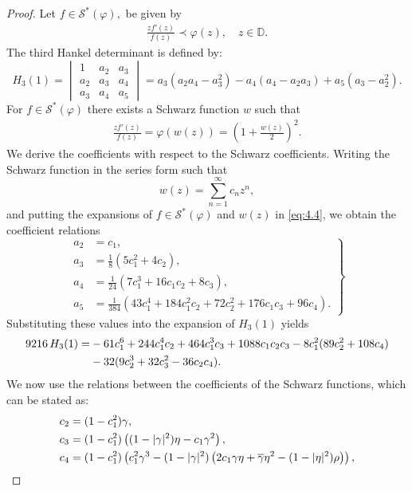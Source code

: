 \documentclass[10pt,a4paper]{amsart}
\begin{document}
\begin{proof}
Let $f\in \mathcal{S}^*(\varphi),$ be given by 
\begin{align*}
	\frac{z f'(z)}{f(z)}\prec \varphi(z), \quad z\in \mathbb{D}.
\end{align*}
 The third Hankel determinant is defined by:
\[
H_3(1)=
\begin{vmatrix}
	1 & a_2 & a_3 \\
	a_2 & a_3 & a_4 \\
	a_3 & a_4 & a_5
\end{vmatrix}
= a_3(a_2 a_4 - a_3^2)-a_4(a_4-a_2a_3)+a_5(a_3-a_2^2).
\]
For $f\in\mathcal{S}^*(\varphi)$ there exists a Schwarz function $w$ such that
\begin{align}\label{eq:4.4}
	\frac{z f'(z)}{f(z)}=\varphi(w(z))=\left(1+\frac{w(z)}{2}\right)^2.
\end{align}
We derive the coefficients with respect to the Schwarz coefficients.
Writing the Schwarz function in the series form such that
\[
w(z)=\sum_{n=1}^{\infty} c_n z^n,
\]
and putting the expansions of $f\in \mathcal{S}^*(\varphi)$ and $w(z)$ in \eqref{eq:4.4},
we obtain the coefficient relations
\begin{equation}
	\left.
	\begin{aligned}
		a_2 &= c_1,\\
		a_3 &= \frac{1}{8}\left(5c_1^2+4c_2\right),\\
		a_4 &= \frac{1}{24}\left(7c_1^3+16c_1c_2+8c_3\right),\\
		a_5 &= \frac{1}{384}\left(43c_1^4+184c_1^2c_2+72c_2^2+176c_1c_3+96c_4\right).
	\end{aligned}
	\right\}
\end{equation}
Substituting these values into the expansion of $H_3(1)$ yields
\begin{align}\label{eq:5.2}
	9216\, H_{3}(1)=&
	-61c_1^6 + 244c_1^4c_2 + 464c_1^3c_3 + 1088c_1c_2c_3
	- 8c_1^2(89c_2^2 + 108c_4)\notag \\
	\qquad
	&- 32(9c_2^3 + 32c_3^2 - 36c_2c_4).
\end{align}
We now use the relations between the coefficients of the Schwarz functions, which can be stated as:
\begin{align}\label{eq:5.3}
	c_2 &= (1-c_1^2)\gamma,\notag\\
	c_3 &= (1-c_1^2)\left((1-|\gamma|^2)\eta - c_1\gamma^2\right),\notag\\
	c_4 &= (1-c_1^2)\left(c_1^2\gamma^3 - (1-|\gamma|^2)\left(2c_1\gamma\eta + \overline{\gamma}\eta^2 - (1-|\eta|^2)\rho\right)\right),

\end{align}
\end{proof}
\end{document}

